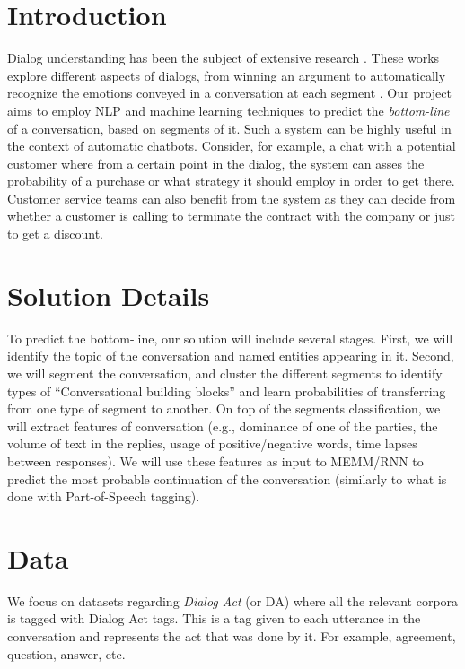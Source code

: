 \section{Introduction}
Dialog understanding has been the subject of 
extensive research \cite{BohusR03,BordesW16,GhazvininejadBC17,ShawarA03,DBLP:conf/icassp/JiB05,DBLP:conf/coling/WermterL96}. These works explore 
different aspects of dialogs, from winning an argument \cite{TanNDL16} 
to automatically recognize the emotions conveyed in a conversation at each segment \cite{AyadiKK11}. 
Our project aims to employ NLP and machine learning techniques to 
predict the {\em bottom-line} of a conversation, based on segments 
of it. Such a system can be highly useful in the context of automatic 
chatbots. Consider, for example, a chat with a potential customer where 
from a certain point in the dialog, the system can asses the probability of a purchase 
or what strategy it should employ in order to get there. 
Customer service teams can also benefit from the system as they can decide 
from whether a customer is calling to terminate the contract with the company 
or just to get a discount.

\section{Solution Details}
To predict the bottom-line, our solution will include several stages. 
First, we will identify the topic of the conversation and named entities 
appearing in it. Second, we will segment the conversation, 
and cluster the different segments to identify types of 
``Conversational building blocks'' and learn probabilities 
of transferring from one type of segment to another. 
On top of the segments classification, we will extract features of 
conversation (e.g., dominance of one of the parties, 
the volume of text in the replies, usage of positive/negative words, 
time lapses between responses). 
We will use these features as input to MEMM/RNN to predict the 
most probable continuation of the conversation 
(similarly to what is done with Part-of-Speech tagging). 


\section{Data}
We focus on datasets regarding {\em Dialog Act} (or DA) where all the relevant corpora is tagged with Dialog Act tags. 
This is a tag given to each utterance in the conversation and represents the act that was done by it. 
For example, agreement, question, answer, etc.

